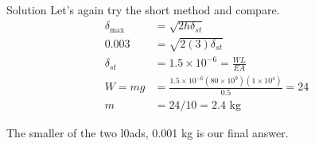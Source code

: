 \documentclass[10pt, svgnames]{beamer}
\begin{document}
\begin{frame}[label={sec:orgdbbefa9}]{Solution Let's again try the short method and compare.}
\begin{align*}
    \delta_{\max} &= \sqrt{2h\delta_{st}} \\
    0.003 &= \sqrt{2(3)\delta_{st}} \\
    \delta_{st} &= 1.5 \times 10^{-6} = \frac{WL}{EA} \\
    W = mg &= \frac{1.5 \times 10^{-6}(80 \times 10^{9})(1 \times 10^{4})}{0.5} = 24 \\
    m &= 24/10 = 2.4 \text{ kg}
\end{align*}

The smaller of the two l0ads, 0.001 kg is our final answer.
\end{frame}
\end{document}
